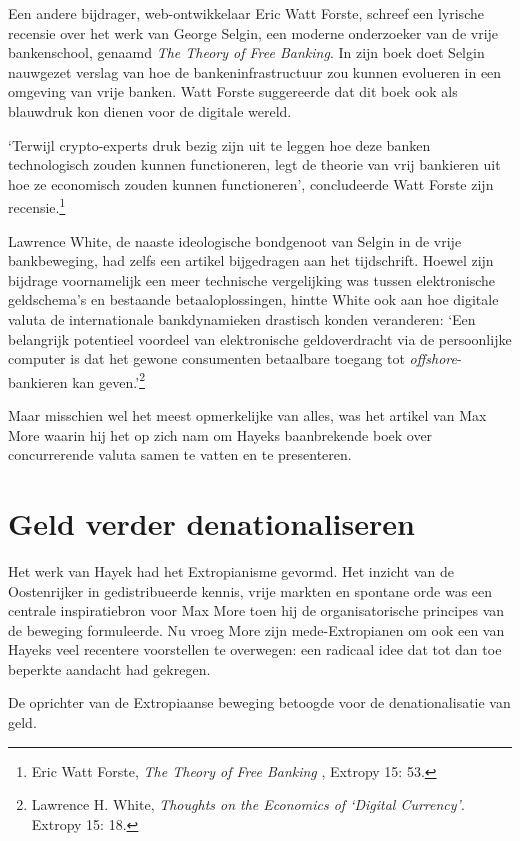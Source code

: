 \documentclass[
  a5paper,
  smalldemyvopaper,11pt,twoside,onecolumn,openright,extrafontsizes,
hidelinks]{memoir}
\begin{document}
Een andere bijdrager, web-ontwikkelaar Eric Watt Forste, schreef een
lyrische recensie over het werk van George Selgin, een moderne
onderzoeker van de vrije bankenschool, genaamd \emph{The Theory of Free
Banking}. In zijn boek doet Selgin nauwgezet verslag van hoe de
bankeninfrastructuur zou kunnen evolueren in een omgeving van vrije
banken. Watt Forste suggereerde dat dit boek ook als blauwdruk kon
dienen voor de digitale wereld.

`Terwijl crypto-experts druk bezig zijn uit te leggen hoe deze banken
technologisch zouden kunnen functioneren, legt de theorie van vrij
bankieren uit hoe ze economisch zouden kunnen functioneren',
concludeerde Watt Forste zijn recensie.\footnote{Eric Watt Forste,
  \emph{The Theory of Free Banking }, Extropy 15: 53.}

Lawrence White, de naaste ideologische bondgenoot van Selgin in de vrije
bankbeweging, had zelfs een artikel bijgedragen aan het tijdschrift.
Hoewel zijn bijdrage voornamelijk een meer technische vergelijking was
tussen elektronische geldschema's en bestaande betaaloplossingen, hintte
White ook aan hoe digitale valuta de internationale bankdynamieken
drastisch konden veranderen: `Een belangrijk potentieel voordeel van
elektronische geldoverdracht via de persoonlijke computer is dat het
gewone consumenten betaalbare toegang tot \emph{offshore}-bankieren kan
geven.'\footnote{Lawrence H. White, \emph{Thoughts on the Economics of
  `Digital Currency'}. Extropy 15: 18.}

Maar misschien wel het meest opmerkelijke van alles, was het artikel van
Max More waarin hij het op zich nam om Hayeks baanbrekende boek over
concurrerende valuta samen te vatten en te presenteren.

\section{Geld verder
denationaliseren}\label{geld-verder-denationaliseren}

Het werk van Hayek had het Extropianisme gevormd. Het inzicht van de
Oostenrijker in gedistribueerde kennis, vrije markten en spontane orde
was een centrale inspiratiebron voor Max More toen hij de
organisatorische principes van de beweging formuleerde. Nu vroeg More
zijn mede-Extropianen om ook een van Hayeks veel recentere voorstellen
te overwegen: een radicaal idee dat tot dan toe beperkte aandacht had
gekregen.

De oprichter van de Extropiaanse beweging betoogde voor de
denationalisatie van geld.
\end{document}
